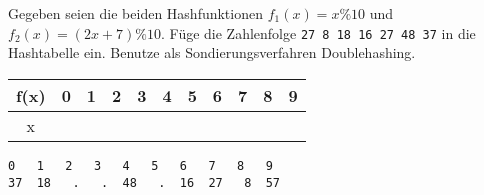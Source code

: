 
\renewcommand{\arraystretch}{2.0}
\setlength{\tabcolsep}{14pt}
\question[3]
Gegeben seien die beiden Hashfunktionen $f_1(x) = x \% 10$ und $f_2(x) = (2x+7) \% 10$.
Füge die Zahlenfolge
\texttt{27 8 18 16 27 48 37}  in die Hashtabelle ein.
Benutze als Sondierungsverfahren Doublehashing.

\begin{tabular}{|c|c|c|c|c|c|c|c|c|c|c|}
\hline f(x) & 0 & 1 & 2 & 3 & 4 & 5 & 6 & 7 & 8 & 9 \\
\hline x     &   &    &    &   &   &    &    &   &   & \\
\hline
\end{tabular}

\ifprintanswers
\begin{solutionbox}{2cm}
\begin{lstlisting}
0   1   2   3   4   5   6   7   8   9
37  18   .   .  48   .  16  27   8  57
\end{lstlisting}
\end{solutionbox}
\fi
